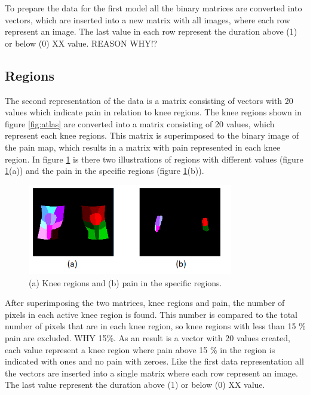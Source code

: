 \noindent
To prepare the data for the first model all the binary matrices are converted into vectors, which are inserted into a new matrix with all images, where each row represent an image. The last value in each row represent the duration above (1) or below (0) XX value. REASON WHY!?

\subsection{Regions}
The second representation of the data is a matrix consisting of vectors with 20 values which indicate pain in relation to knee regions. 
The knee regions shown in figure \ref{fig:atlas} are converted into a matrix consisting of 20 values, which represent each knee regions. This matrix is superimposed to the binary image of the pain map, which results in a matrix with pain represented in each knee region. In figure \ref{fig:binregions} is there two illustrations of regions with different values (figure \ref{fig:binregions}(a)) and the pain in the specific regions (figure \ref{fig:binregions}(b)).

\begin{figure} [H]
\centering
\includegraphics[width=0.8\textwidth]{figures/binregions}
\caption{(a) Knee regions and (b) pain in the specific regions.}
\label{fig:binregions}
\end{figure}

\noindent
After superimposing the two matrices, knee regions and pain, the number of pixels in each active knee region is found. This number is compared to the total number of pixels that are in each knee region, so knee regions with less than 15 \% pain are excluded. WHY 15\%. As an result is a vector with 20 values created, each value represent a knee region where pain above 15 \% in the region is indicated with ones and no pain with zeroes. 
Like the first data representation all the vectors are inserted into a single matrix where each row represent an image. The last value represent the duration above (1) or below (0) XX value.


